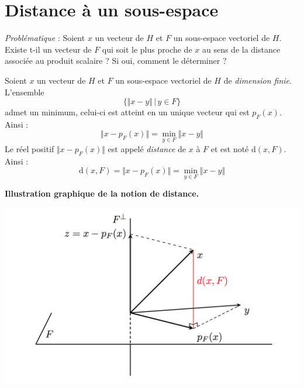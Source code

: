 \documentclass[french,11pt,twoside]{VcCours}
\begin{document}
\section{Distance à un sous-espace}

\emph{Problématique} : Soient $x$ un vecteur de $H$ et $F$ un sous-espace vectoriel de $H$. Existe t-il un vecteur de $F$ qui soit \og le plus proche \fg de $x$ au sens de la distance associée au produit scalaire ? Si oui, comment le déterminer ?

\medskip

\begin{Theoreme}{} Soient $x$ un vecteur de $H$ et $F$ un sous-espace vectoriel de $H$ de \emph{dimension finie}. L'ensemble 
$$ \lbrace \Vert x-y \Vert \, \vert \, y \in F \rbrace$$
admet un minimum, celui-ci est atteint en un unique vecteur qui est $p_F(x)$. Ainsi :
$$ \Vert x - p_F(x) \Vert = \min_{y \in F} \Vert x-y \Vert$$
Le réel positif $\Vert x - p_F(x) \Vert$ est appelé \emph{distance} de $x$ à $F$ et est noté $\textrm{d}(x,F)$. Ainsi :
$$ \textrm{d}(x,F) = \Vert x - p_F(x) \Vert = \min_{y \in F} \Vert x-y \Vert$$
\end{Theoreme}

\begin{center}
\textbf{Illustration graphique de la notion de distance.}
\end{center}

\begin{center}
\includegraphics[scale=0.4]{dist}
\end{center}

\begin{Demonstration}{}

\newpage

\vspace*{4cm}
\end{Demonstration}
\end{document}
